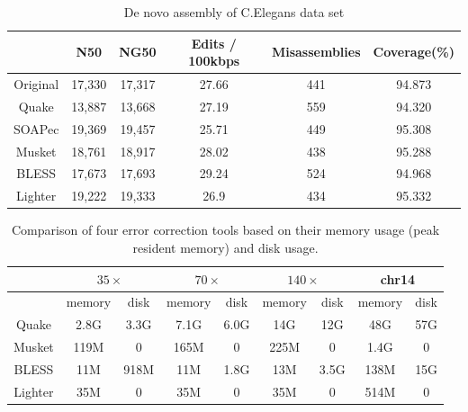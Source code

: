 \documentclass{bmcart}
\begin{document}
\begin{backmatter}
\begin{table}[h!] %
\caption{De novo assembly of C.Elegans data set}
\begin{tabular}{|c|c|c|c|c|c|} \hline
	   & N50 &	NG50	& Edits / 100kbps &	Misassemblies	& Coverage(\%) \\ \hline
Original &	17,330	& 17,317	& 27.66	& 441& 	94.873 \\ \hline
Quake	&	13,887	& 13,668	& 27.19	& 559	& 94.320 \\ \hline
SOAPec  & 19,369	& 19,457	& 25.71	& 449	& 95.308 \\ \hline
Musket	&	18,761	& 18,917	& 28.02	& 438	& 95.288 \\ \hline
BLESS	&	17,673	& 17,693	& 29.24	& 524	& 94.968 \\ \hline
Lighter	&	19,222	& 19,333	& 26.9	& 434	& 95.332 \\ \hline
\end{tabular}
\end{table}

\begin{table}[h!] %
\caption{Comparison of four error correction tools based on their memory usage (peak resident memory) and disk usage.\label{table:memory_usage}}
\begin{tabular}{|c|c|c||c|c||c|c||c|c|} \hline
		& \multicolumn{2}{|c||}{$35\times$} & \multicolumn{2}{|c||}{$70\times$}  & \multicolumn{2}{|c||}{$140\times$} & \multicolumn{2}{|c|}{chr14}  \\ \hline
		& memory & disk & memory & disk & memory & disk & memory & disk \\ \hline
Quake   & 2.8G	& 3.3G & 7.1G & 6.0G & 14G & 12G & 48G & 57G \\ \hline		
Musket	& 119M	& 0 & 165M & 0 & 225M & 0 & 1.4G & 0 \\ \hline
BLESS	& 11M	& 918M & 11M & 1.8G & 13M & 3.5G & 138M & 15G \\ \hline
Lighter	& 35M	& 0 & 35M & 0 & 35M & 0 & 514M & 0 \\ \hline
\end{tabular}
\end{table}

\end{backmatter}
\end{document}
